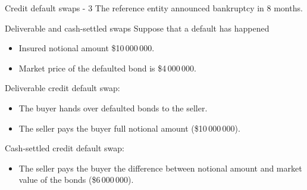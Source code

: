 \documentclass{beamer}
\begin{document}
\begin{frame}{Credit default swaps - 3}
\justify
The reference entity announced bankruptcy in 8 months.

\justify
\centering
{}
\end{frame}



\begin{frame}{Deliverable and cash-settled swaps}
\justify
Suppose that a default has happened
\begin{itemize}
\justifying
\item Insured notional amount \$10\,000\,000.
\item Market price of the defaulted bond is \$4\,000\,000.
\end{itemize}

\justify
\alert{Deliverable} credit default swap:
\begin{itemize}
\justifying
\item The buyer hands over defaulted bonds to the seller.
\item The seller pays the buyer full notional amount (\$10\,000\,000).
\end{itemize}

\justify
\alert{Cash-settled} credit default swap:
\begin{itemize}
\justifying
\item The seller pays the buyer the difference between notional amount and market value of the bonds  (\$6\,000\,000).
\end{itemize}

\end{frame}
\end{document}
